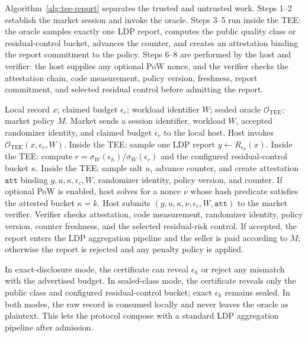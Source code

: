 \documentclass[conference]{IEEEtran}
\newcommand{\eps}{\epsilon}
\newcommand{\TEE}{\mathrm{TEE}}
\begin{document}
Algorithm~\ref{alg:tee-report} separates the trusted and untrusted work. Steps 1--2 establish the market session and invoke the oracle. Steps 3--5 run inside the TEE: the oracle samples exactly one LDP report, computes the public quality class or residual-control bucket, advances the counter, and creates an attestation binding the report commitment to the policy. Steps 6--8 are performed by the host and verifier: the host supplies any optional PoW nonce, and the verifier checks the attestation chain, code measurement, policy version, freshness, report commitment, and selected residual control before admitting the report.

\begin{algorithm}[t]
\caption{TEE-Sealed LDP Market Report}
\label{alg:tee-report}
\begin{algorithmic}[1]
\Require Local record $x$; claimed budget $\eps_c$; workload identifier $W$; sealed oracle $\mathcal{O}_{\TEE}$; market policy $M$.
\State Market sends a session identifier, workload $W$, accepted randomizer identity, and claimed budget $\eps_c$ to the local host.
\State Host invokes $\mathcal{O}_{\TEE}(x,\eps_c,W)$.
\State Inside the TEE: sample one LDP report $y\leftarrow R_{\eps_h}(x)$.
\State Inside the TEE: compute $r=\sigma_W(\eps_h)/\sigma_W(\eps_c)$ and the configured residual-control bucket $\kappa$.
\State Inside the TEE: sample salt $u$, advance counter, and create attestation $\texttt{att}$ binding $y,u,\kappa,\eps_c,W$, randomizer identity, policy version, and counter.
\State If optional PoW is enabled, host solves for a nonce $\nu$ whose hash predicate satisfies the attested bucket $\kappa=k$.
\State Host submits $(y,u,\kappa,\nu,\eps_c,W,\texttt{att})$ to the market verifier.
\State Verifier checks attestation, code measurement, randomizer identity, policy version, counter freshness, and the selected residual-risk control.
\State If accepted, the report enters the LDP aggregation pipeline and the seller is paid according to $M$; otherwise the report is rejected and any penalty policy is applied.
\end{algorithmic}
\end{algorithm}

In exact-disclosure mode, the certificate can reveal $\eps_h$ or reject any mismatch with the advertised budget. In sealed-class mode, the certificate reveals only the public class and configured residual-control bucket; exact $\eps_h$ remains sealed. In both modes, the raw record is consumed locally and never leaves the oracle as plaintext. This lets the protocol compose with a standard LDP aggregation pipeline after admission.
\end{document}
